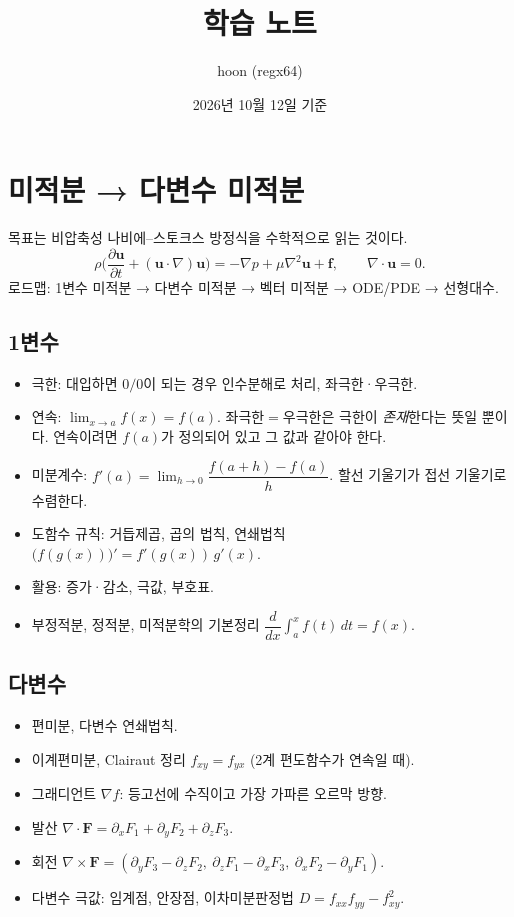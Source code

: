 \documentclass[11pt]{article}
\title{학습 노트}
\author{hoon (regx64)}
\date{2026년 10월 12일 기준}
\begin{document}
\maketitle
\tableofcontents

\section{미적분 → 다변수 미적분}
목표는 비압축성 나비에–스토크스 방정식을 수학적으로 읽는 것이다.
\[
\rho\Big(\frac{\partial \mathbf u}{\partial t}+(\mathbf u\cdot\nabla)\mathbf u\Big)=-\nabla p+\mu\nabla^2\mathbf u+\mathbf f,\qquad \nabla\cdot\mathbf u=0.
\]
로드맵: 1변수 미적분 → 다변수 미적분 → 벡터 미적분 → ODE/PDE → 선형대수.

\subsection{1변수}
\begin{itemize}[nosep]
\item 극한: 대입하면 $0/0$이 되는 경우 인수분해로 처리, 좌극한·우극한.
\item 연속: $\lim_{x\to a}f(x)=f(a)$. 좌극한$=$우극한은 극한이 \emph{존재}한다는 뜻일 뿐이다. 연속이려면 $f(a)$가 정의되어 있고 그 값과 같아야 한다.
\item 미분계수: $f'(a)=\lim_{h\to0}\dfrac{f(a+h)-f(a)}{h}$. 할선 기울기가 접선 기울기로 수렴한다.
\item 도함수 규칙: 거듭제곱, 곱의 법칙, 연쇄법칙 $\big(f(g(x))\big)'=f'(g(x))\,g'(x)$.
\item 활용: 증가·감소, 극값, 부호표.
\item 부정적분, 정적분, 미적분학의 기본정리 $\dfrac{d}{dx}\displaystyle\int_a^x f(t)\,dt=f(x)$.
\end{itemize}

\subsection{다변수}
\begin{itemize}[nosep]
\item 편미분, 다변수 연쇄법칙.
\item 이계편미분, Clairaut 정리 $f_{xy}=f_{yx}$ (2계 편도함수가 연속일 때).
\item 그래디언트 $\nabla f$: 등고선에 수직이고 가장 가파른 오르막 방향.
\item 발산 $\nabla\cdot\mathbf F=\partial_xF_1+\partial_yF_2+\partial_zF_3$.
\item 회전 $\nabla\times\mathbf F=(\partial_yF_3-\partial_zF_2,\ \partial_zF_1-\partial_xF_3,\ \partial_xF_2-\partial_yF_1)$.
\item 다변수 극값: 임계점, 안장점, 이차미분판정법 $D=f_{xx}f_{yy}-f_{xy}^2$.
\end{itemize}
\end{document}
